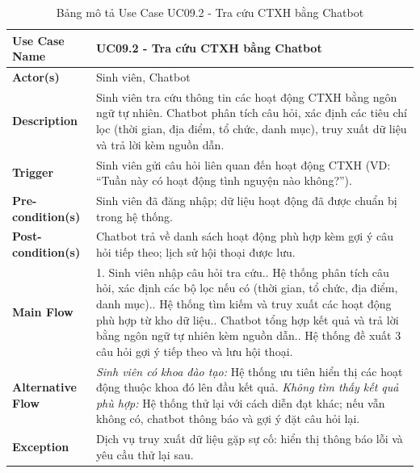 \begin{table}[H]
	\centering
	\renewcommand{\arraystretch}{1.25}
	\begin{tabular}{|p{3.8cm}|p{11.2cm}|}
		\hline
		\textbf{Use Case Name} & \textbf{UC09.2 - Tra cứu CTXH bằng Chatbot} \\ \hline
		\textbf{Actor(s)} & Sinh viên, Chatbot \\ \hline
		\textbf{Description} & Sinh viên tra cứu thông tin các hoạt động CTXH bằng ngôn ngữ tự nhiên. Chatbot phân tích câu hỏi, xác định các tiêu chí lọc (thời gian, địa điểm, tổ chức, danh mục), truy xuất dữ liệu và trả lời kèm nguồn dẫn. \\ \hline
		\textbf{Trigger} & Sinh viên gửi câu hỏi liên quan đến hoạt động CTXH (VD: ``Tuần này có hoạt động tình nguyện nào không?''). \\ \hline
		\textbf{Pre-condition(s)} & Sinh viên đã đăng nhập; dữ liệu hoạt động đã được chuẩn bị trong hệ thống. \\ \hline
		\textbf{Post-condition(s)} & Chatbot trả về danh sách hoạt động phù hợp kèm gợi ý câu hỏi tiếp theo; lịch sử hội thoại được lưu. \\ \hline
		\textbf{Main Flow} &
		1. Sinh viên nhập câu hỏi tra cứu.\newline
		2. Hệ thống phân tích câu hỏi, xác định các bộ lọc nếu có (thời gian, tổ chức, địa điểm, danh mục).\newline
		3. Hệ thống tìm kiếm và truy xuất các hoạt động phù hợp từ kho dữ liệu.\newline
		4. Chatbot tổng hợp kết quả và trả lời bằng ngôn ngữ tự nhiên kèm nguồn dẫn.\newline
		5. Hệ thống đề xuất 3 câu hỏi gợi ý tiếp theo và lưu hội thoại. \\ \hline
		\textbf{Alternative Flow} &
		\textit{Sinh viên có khoa đào tạo:} Hệ thống ưu tiên hiển thị các hoạt động thuộc khoa đó lên đầu kết quả.\newline
		\textit{Không tìm thấy kết quả phù hợp:} Hệ thống thử lại với cách diễn đạt khác; nếu vẫn không có, chatbot thông báo và gợi ý đặt câu hỏi lại. \\ \hline
		\textbf{Exception} & Dịch vụ truy xuất dữ liệu gặp sự cố: hiển thị thông báo lỗi và yêu cầu thử lại sau. \\ \hline
	\end{tabular}
	\caption{Bảng mô tả Use Case UC09.2 - Tra cứu CTXH bằng Chatbot}
\end{table}

